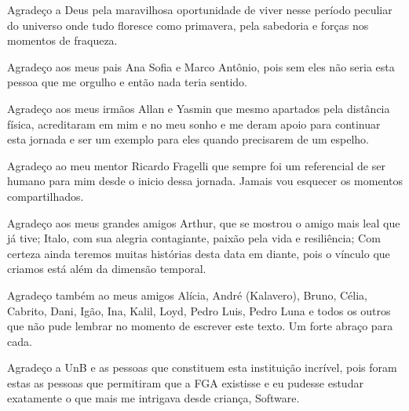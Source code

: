 \begin{agradecimentos}

Agradeço a Deus pela maravilhosa oportunidade de viver nesse período peculiar do universo onde tudo floresce como primavera, pela sabedoria e forças nos momentos de fraqueza.

Agradeço aos meus pais Ana Sofia e Marco Antônio, pois sem eles não seria esta pessoa que me orgulho e então nada teria sentido.

Agradeço aos meus irmãos Allan e Yasmin que mesmo apartados pela distância física, acreditaram em mim e no meu sonho e me deram apoio para continuar esta jornada e ser um exemplo para eles quando precisarem de um espelho.

Agradeço ao meu mentor Ricardo Fragelli que sempre foi um referencial de ser humano para mim desde o inicio dessa jornada. Jamais vou esquecer os momentos compartilhados.

Agradeço aos meus grandes amigos Arthur, que se mostrou o amigo mais leal que já tive; Italo, com sua alegria contagiante, paixão pela vida e resiliência; Com certeza ainda teremos muitas histórias desta data em diante, pois o vínculo que criamos está além da dimensão temporal.

Agradeço também ao meus amigos Alícia, André (Kalavero), Bruno, Célia, Cabrito, Dani, Igão, Ina, Kalil, Loyd, Pedro Luis, Pedro Luna e todos os outros que não pude lembrar no momento de escrever este texto. Um forte abraço para cada.

Agradeço a UnB e as pessoas que constituem esta instituição incrível, pois foram estas as pessoas que permitiram que a FGA existisse e eu pudesse estudar exatamente o que mais me intrigava desde criança, Software.

\end{agradecimentos}
